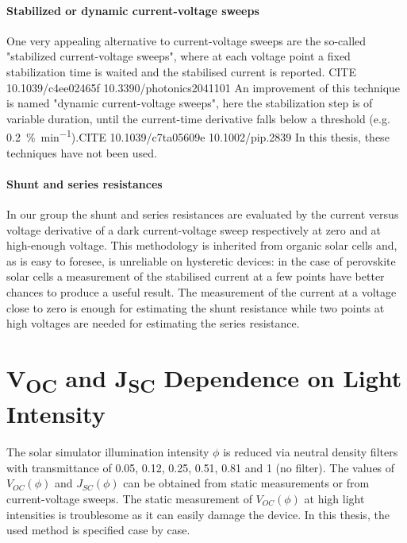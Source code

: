 \paragraph{Stabilized or dynamic current-voltage sweeps} One very appealing alternative to current-voltage sweeps are the so-called "stabilized current-voltage sweeps", where at each voltage point a fixed stabilization time is waited and the stabilised current is reported. CITE 10.1039/c4ee02465f 10.3390/photonics2041101
An improvement of this technique is named "dynamic current-voltage sweeps", here the stabilization step is of variable duration, until the current-time derivative falls below a threshold (e.g. \SI{0.2}{\%\per\minute}).CITE 10.1039/c7ta05609e 10.1002/pip.2839
In this thesis, these techniques have not been used.

\paragraph{Shunt and series resistances} \label{resistances} In our group the shunt and series resistances are evaluated by the current versus voltage derivative of a dark current-voltage sweep respectively at zero and at high-enough voltage. This methodology is inherited from organic solar cells and, as is easy to foresee, is unreliable on hysteretic devices: in the case of perovskite solar cells a measurement of the stabilised current at a few points have better chances to produce a useful result. The measurement of the current at a voltage close to zero is enough for estimating the shunt resistance while two points at high voltages are needed for estimating the series resistance.

\section{V\textsubscript{OC} and J\textsubscript{SC} Dependence on Light Intensity}
The solar simulator illumination intensity $\phi$ is reduced via neutral density filters with transmittance of 0.05, 0.12, 0.25, 0.51, 0.81 and 1 (no filter). The values of $V_{OC}(\phi)$ and $J_{SC}(\phi)$ can be obtained from static measurements or from current-voltage sweeps. The static measurement of $V_{OC}(\phi)$ at high light intensities is troublesome as it can easily damage the device. In this thesis, the used method is specified case by case. %

